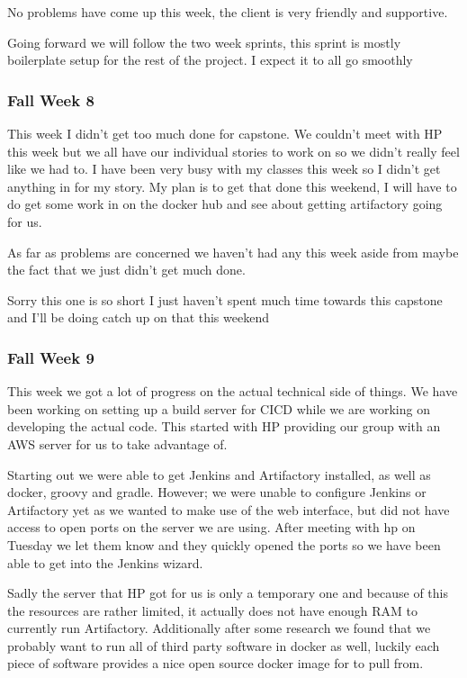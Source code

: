 \documentclass[onecolumn, draftclsnofoot,10pt, compsoc]{IEEEtran}
\begin{document}
No problems have come up this week, the client is very friendly and supportive.

Going forward we will follow the two week sprints, this sprint is mostly boilerplate setup for the rest of the project. I expect it to all go smoothly

\subsubsection*{Fall Week 8}
This week I didn't get too much done for capstone. We couldn't meet with HP this week but we all have our individual stories to work on so we didn't really feel like we had to. I have been very busy with my classes this week so I didn't get anything in for my story. My plan is to get that done this weekend, I will have to do get some work in on the docker hub and see about getting artifactory going for us.

As far as problems are concerned we haven't had any this week aside from maybe the fact that we just didn't get much done.

Sorry this one is so short I just haven't spent much time towards this capstone and I'll be doing catch up on that this weekend

\subsubsection*{Fall Week 9}
This week we got a lot of progress on the actual technical side of things. We have been working on setting up a build server for CICD while we are working on developing the actual code. This started with HP providing our group with an AWS server for us to take advantage of.

Starting out we were able to get Jenkins and Artifactory installed, as well as docker, groovy and gradle. However; we were unable to configure Jenkins or Artifactory yet as we wanted to make use of the web interface, but did not have access to open ports on the server we are using. After meeting with hp on Tuesday we let them know and they quickly opened the ports so we have been able to get into the Jenkins wizard.

Sadly the server that HP got for us is only a temporary one and because of this the resources are rather limited, it actually does not have enough RAM to currently run Artifactory. Additionally after some research we found that we probably want to run all of third party software in docker as well, luckily each piece of software provides a nice open source docker image for to pull from.
\end{document}
